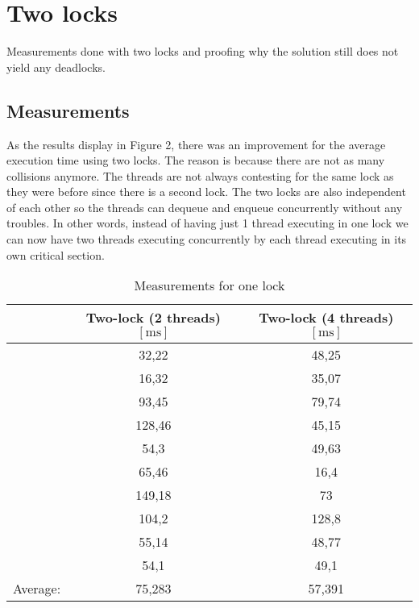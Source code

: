 \documentclass[a4paper,11pt,twoside,fleqn]{article}
\begin{document}

\section{Two locks}
Measurements done with two locks and proofing why the solution still does not yield any deadlocks.

\subsection{Measurements}

As the results display in Figure 2, there was an improvement for the average execution time using two locks. The reason is because there are not as many collisions anymore. The threads are not always contesting for the same lock as they were before since there is a second lock. The two locks are also independent of each other so the threads can dequeue and enqueue concurrently without any troubles. In other words, instead of having just 1 thread executing in one lock we can now have two threads executing concurrently by each thread executing in its own critical section.

\begin {table}[H]
\caption {Measurements for one lock}\label{tab:title} 
\begin{center}
\begin{tabulary}{0.7\linewidth}{sSS}
\toprule
        & \textnormal{Two-lock (2 threads)}$[\si{\milli\second}]$ & \textnormal{Two-lock (4 threads)}$[\si{\milli\second}]$ \\
\midrule
                      & 32,22                 & 48,25  \\
                      & 16,32                 & 35,07  \\
                      & 93,45                 & 79,74  \\
                      & 128,46                & 45,15  \\
                      & 54,3                  & 49,63  \\
                      & 65,46                 & 16,4   \\
                      & 149,18                & 73     \\
                      & 104,2                 & 128,8  \\
                      & 55,14                 & 48,77  \\
                      & 54,1                  & 49,1   \\
\midrule
Average:        & 75,283                & 57,391 \\
\bottomrule
\end{tabulary}
\end{center}
\end {table}
\end{document}
